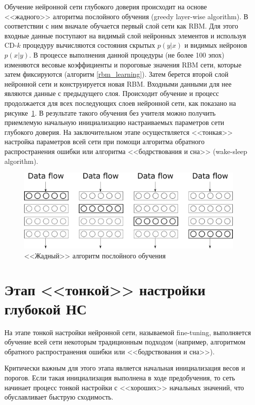 Обучение нейронной сети глубокого доверия происходит на основе <<жадного>> алгоритма послойного обучения (greedy layer-wise algorithm). В соответствии с ним вначале обучается первый слой сети как RBM. Для этого входные данные поступают на видимый слой нейронных элементов и используя CD-$k$ процедуру вычисляются состояния скрытых $p(y \lvert x)$ и видимых нейронов $p(x \lvert y)$. В процессе выполнения данной процедуры (не более 100 эпох) изменяются весовые коэффициенты и пороговые значения RBM сети, которые затем фиксируются (алгоритм \ref{rbm_learning}). Затем берется второй слой нейронной сети и конструируется новая RBM. Входными данными для нее являются данные с предыдущего слоя. Происходит обучение и процесс продолжается для всех последующих слоев нейронной сети, как показано на рисунке~\ref{fig:pic1_4}. В результате такого обучения без учителя можно получить приемлемую начальную инициализацию настраиваемых параметров сети глубокого доверия. На заключительном этапе осуществляется <<тонкая>> настройка параметров всей сети при помощи алгоритма обратного распространения ошибки или алгоритма <<бодрствования и сна>> (wake-sleep algorithm). 

\begin{figure}[H]
	\centering
	\includegraphics[width=\textwidth]{author/part3/figures/pic1-4.png}
	\caption{<<Жадный>> алгоритм послойного обучения}
	\label{fig:pic1_4}
\end{figure}

\section{Этап <<тонкой>> настройки глубокой НС}

На этапе тонкой настройки нейронной сети, называемой fine-tuning, выполняется обучение всей сети некоторым традиционным подходом (например, алгоритмом обратного распространения ошибки или <<бодрствования и сна>>).

Критически важным для этого этапа является начальная инициализация весов и порогов. Если такая инициализация выполнена в ходе предобучения, то сеть начинает процесс тонкой настройки с <<хороших>> начальных значений, что обуславливает быструю сходимость.


